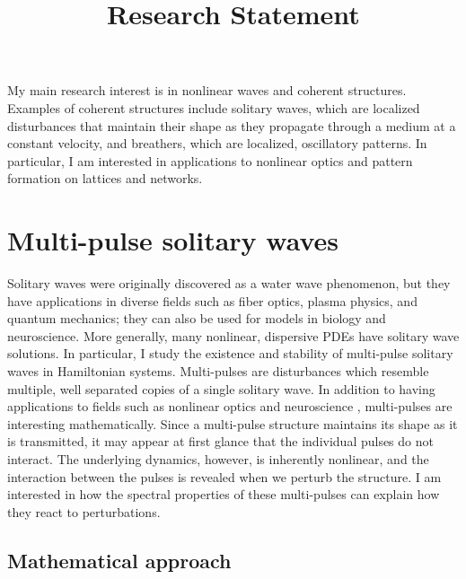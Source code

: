 \documentclass[12pt,reqno,oneside]{article}
\title{Research Statement}
\date{\vspace{-12ex}}
\theoremstyle{definition}
\theoremstyle{remark}
\begin{document}
\thispagestyle{empty}

\maketitle

My main research interest is in nonlinear waves and coherent structures. Examples of coherent structures include solitary waves, which are localized disturbances that maintain their shape as they propagate through a medium at a constant velocity, and breathers, which are localized, oscillatory patterns. In particular, I am interested in applications to nonlinear optics and pattern formation on lattices and networks.

\section{Multi-pulse solitary waves}

Solitary waves were originally discovered as a water wave phenomenon, but they have applications in diverse fields such as fiber optics, plasma physics, and quantum mechanics; they can also be used for models in biology and neuroscience. More generally, many nonlinear, dispersive PDEs have solitary wave solutions. In particular, I study the existence and stability of multi-pulse solitary waves in Hamiltonian systems. Multi-pulses are disturbances which resemble multiple, well separated copies of a single solitary wave. In addition to having applications to fields such as nonlinear optics and neuroscience \cite{Evans1982}, multi-pulses are interesting mathematically. Since a multi-pulse structure maintains its shape as it is transmitted, it may appear at first glance that the individual pulses do not interact. The underlying dynamics, however, is inherently nonlinear, and the interaction between the pulses is revealed when we perturb the structure. I am interested in how the spectral properties of these multi-pulses can explain how they react to perturbations.

\subsection{Mathematical approach}
\end{document}
